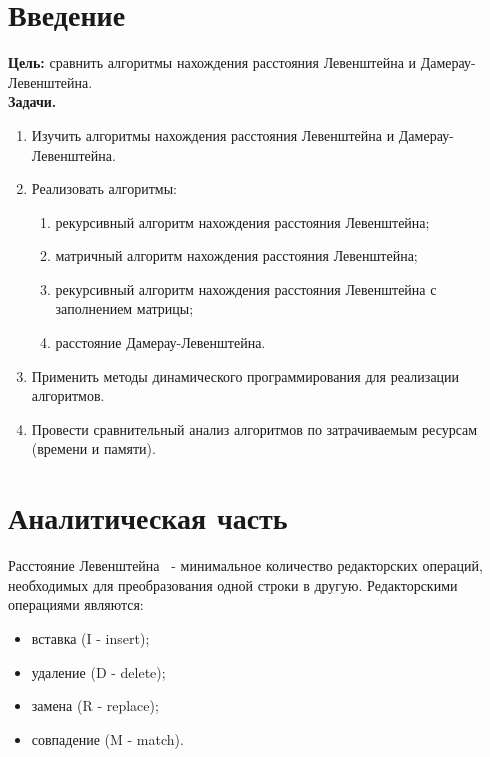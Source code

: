 \documentclass[a4paper,oneside,14pt]{extreport}
\begin{document}

\newpage
\tableofcontents
{}

\newpage

\chapter*{Введение}

\textbf{Цель:} сравнить алгоритмы нахождения расстояния Левенштейна и Дамерау-Левенштейна.\\

\textbf{Задачи.}
\begin{enumerate}
	\item Изучить алгоритмы нахождения расстояния Левенштейна и Дамерау-Левенштейна.
	\item Реализовать алгоритмы:
	\begin{enumerate}
		\item рекурсивный алгоритм нахождения расстояния Левенштейна;
		\item матричный алгоритм нахождения расстояния Левенштейна;
		\item рекурсивный алгоритм нахождения расстояния Левенштейна с заполнением матрицы;
		\item расстояние Дамерау-Левенштейна.
	\end{enumerate}
	\item Применить методы динамического программирования для реализации алгоритмов.
	\item Провести сравнительный анализ алгоритмов по затрачиваемым ресурсам (времени и памяти).
\end{enumerate}
\newpage
\chapter{Аналитическая часть}
Расстояние Левенштейна~\cite{levenshtein} - минимальное количество редакторских операций, необходимых для преобразования одной строки в другую.
Редакторскими операциями являются:
\begin{itemize}
\item вставка (I - insert);
\item удаление (D - delete);
\item замена (R - replace);
\item совпадение (M - match).
\end{itemize}
\end{document}
